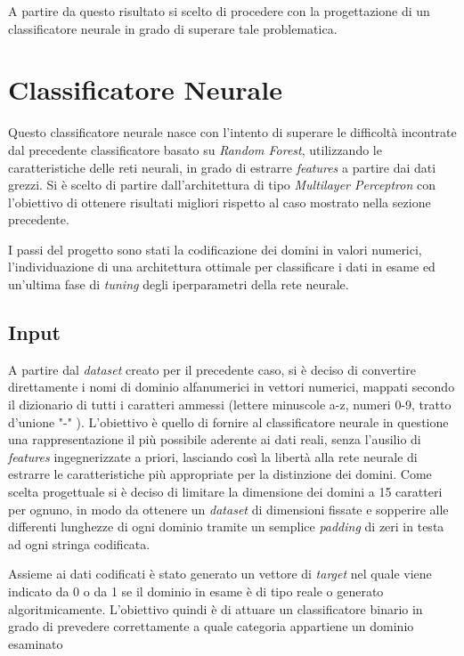 A partire da questo risultato si scelto di procedere con la progettazione di un classificatore neurale in grado di superare tale problematica.


\section{Classificatore Neurale}
\label{classificatorenn}
Questo classificatore neurale nasce con l'intento di superare le difficoltà incontrate dal precedente classificatore basato su \textit{Random Forest}, utilizzando le caratteristiche delle reti neurali, in grado di estrarre \textit{features} a partire dai dati grezzi. Si è scelto di partire dall'architettura di tipo \textit{Multilayer Perceptron} con l'obiettivo di ottenere risultati migliori rispetto al caso mostrato nella sezione precedente.

I passi del progetto sono stati la codificazione dei domini in valori numerici, l'individuazione di una architettura ottimale per classificare i dati in esame ed un'ultima fase di \textit{tuning} degli iperparametri della rete neurale. 

\subsection{Input}
\label{classificatorenninput}
A partire dal \textit{dataset} creato per il precedente caso, si è deciso di convertire direttamente i nomi di dominio alfanumerici in vettori numerici, mappati secondo il dizionario di tutti i caratteri ammessi \cite{icann} (lettere minuscole a-z, numeri 0-9, tratto d'unione "-" ). L'obiettivo è quello di fornire al classificatore neurale in questione una rappresentazione il più possibile aderente ai dati reali, senza l'ausilio di \textit{features} ingegnerizzate a priori, lasciando così la libertà alla rete neurale di estrarre le caratteristiche più appropriate per la distinzione dei domini. Come scelta progettuale si è deciso di limitare la dimensione dei domini a 15 caratteri per ognuno, in modo da ottenere un \textit{dataset} di dimensioni fissate e sopperire alle differenti lunghezze di ogni dominio tramite un semplice \textit{padding} di zeri in testa ad ogni stringa codificata.

Assieme ai dati codificati è stato generato un vettore di \textit{target} nel quale viene indicato da 0 o da 1 se il dominio in esame è di tipo reale o generato algoritmicamente. L'obiettivo quindi è di attuare un classificatore binario in grado di prevedere correttamente a quale categoria appartiene un dominio esaminato 


